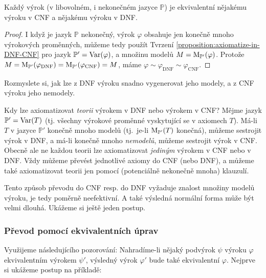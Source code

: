 \begin{corollary}
    Každý výrok (v libovolném, i nekonečném jazyce $\mathbb P$) je ekvivalentní nějakému výroku v CNF a nějakému výroku v DNF.
\end{corollary}
\begin{proof}
I když je jazyk $\mathbb P$ nekonečný, výrok $\varphi$ obsahuje jen konečně mnoho výrokových proměnných, můžeme tedy použít Tvrzení \ref{proposition:axiomatize-in-DNF-CNF} pro jazyk $\mathbb P'=\operatorname{Var}(\varphi)$, a množinu modelů $M=\operatorname{M}_{\mathbb P'}(\varphi)$. Protože $M=\operatorname{M}_{\mathbb P'}(\varphi_{\mathrm{DNF}})=\operatorname{M}_{\mathbb P'}(\varphi_{\mathrm{CNF}})=M$, máme $\varphi\sim\varphi_{\mathrm{DNF}}\sim\varphi_{\mathrm{CNF}}$.
\end{proof}

\begin{exercise}
Rozmyslete si, jak lze z DNF výroku snadno vygenerovat jeho modely, a z CNF výroku jeho nemodely.
\end{exercise}

\begin{remark}
    Kdy lze axiomatizovat \emph{teorii} výrokem v DNF nebo výrokem v CNF? Mějme jazyk $\mathbb P'=\operatorname{Var}(T)$ (tj. všechny výrokové proměnné vyskytující se v axiomech $T$). Má-li $T$ v jazyce $\mathbb P'$ konečně mnoho modelů (tj.\ je-li $\operatorname{M}_{\mathbb P'}(T)$ konečná), můžeme sestrojit výrok v DNF, a má-li konečně mnoho \emph{nemodelů}, můžeme sestrojit výrok v CNF. Obecně ale ne každou teorii lze axiomatizovat \emph{jediným} výrokem v CNF nebo v DNF. Vždy můžeme převést jednotlivé axiomy do CNF (nebo DNF), a můžeme také axiomatizovat teorii jen pomocí (potenciálně nekonečně mnoha) klauzulí.
\end{remark}

Tento způsob převodu do CNF resp. do DNF vyžaduje znalost množiny modelů výroku, je tedy poměrně neefektivní. A také výsledná normální forma může být velmi dlouhá. Ukážeme si ještě jeden postup.

\subsubsection{Převod pomocí ekvivalentních úprav}

Využijeme následujícího pozorování: Nahradíme-li nějaký podvýrok $\psi$ výroku $\varphi$ ekvivalentním výrokem $\psi'$, výsledný výrok $\varphi'$ bude také ekvivalentní $\varphi$. Nejprve si ukážeme postup na příkladě:

